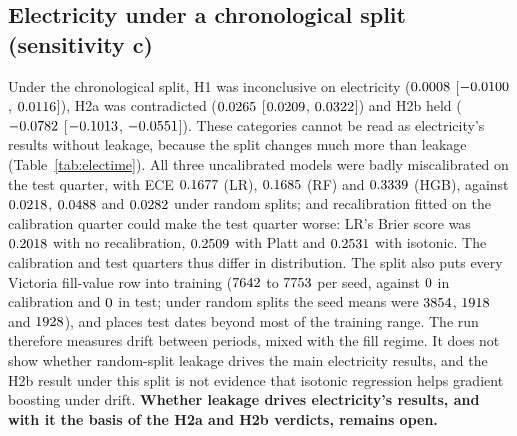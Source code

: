 \documentclass[11pt]{article}
\newcommand{\md}[3]{$#1$ [$#2$, $#3$]}
\newcommand{\ds}[1]{\textsf{#1}}
\newcommand{\ad}{\ds{adult}}
\newcommand{\bm}{\ds{bank-marketing}}
\newcommand{\el}{\ds{electricity}}
\newcommand{\ph}{\ds{phoneme}}
\newcommand{\cat}[1]{\emph{#1}}
\begin{document}
\subsection{Electricity under a chronological split (sensitivity c)}
\label{sec:elec}

Under the chronological split, H1 was inconclusive on \el{}
(\md{\HOneTimeElecMean}{\HOneTimeElecLo}{\HOneTimeElecHi}), H2a was contradicted
(\md{\HTwoATimeElecMean}{\HTwoATimeElecLo}{\HTwoATimeElecHi}) and H2b held
(\md{\HTwoBTimeElecMean}{\HTwoBTimeElecLo}{\HTwoBTimeElecHi}). These categories cannot be read
as \el's results without leakage, because the split changes much more than leakage
(Table~\ref{tab:electime}). All three uncalibrated models were badly miscalibrated on the
test quarter, with ECE $0.1677$ (LR), $0.1685$ (RF) and
$0.3339$ (HGB), against $0.0218$, $0.0488$ and $0.0282$
under random splits; and recalibration fitted on the calibration quarter could make the test
quarter worse: LR's Brier score was $0.2018$ with no recalibration,
$0.2509$ with Platt and $0.2531$ with isotonic. The calibration and
test quarters thus differ in distribution. The split also puts every Victoria fill-value row
into training ($7642$ to $7753$ per seed, against
$0$ in calibration and $0$ in test; under random splits the
seed means were $3854$, $1918$ and $1928$), and
places test dates beyond most of the training range. The run therefore measures drift between
periods, mixed with the fill regime. It does not show whether random-split leakage drives the
main \el{} results, and the H2b result under this split is not evidence that isotonic
regression helps gradient boosting under drift. \textbf{Whether leakage drives \el's
results, and with it the basis of the H2a and H2b verdicts, remains open.}

\begin{table}[!htbp]
\centering
\small

\caption{Pre-specified sensitivity analyses; none changes a verdict. Columns as in
Table~\ref{tab:decision}. \emph{Panel A}: H1 recomputed on the debiased ECE of
\citet[Def.~G.3]{kumar2019} on the same bins, with the same margin and rule, reported
descriptively. It removes only about 41\% of a well-calibrated bin's noise floor and close to
none of a miscalibrated bin's, so a floor difference between RF and LR reappears at about 0.6
times its size with the same sign; its agreement with the plug-in result is not confirmation.
\emph{Panel B}: H2a and H2b with isotonic regression refitted on a stratified 1,351-row subset
of each seed's calibration split on \ad, \bm{} and \el, with the same frozen model and test
split; \ph's rows are its main rows. Per-dataset categories only; the plan defines no overall
verdict for this analysis. It equalises calibration size only, not training size (2,702
against 10,000) or test size (1,351 against 5,000). The H2a \cat{contradicted} on \ad{} and
\bm{} rests on mean Brier rises below 0.001 whose intervals cross the margin only at their
upper ends.}
\label{tab:sens}
\end{table}
\end{document}
